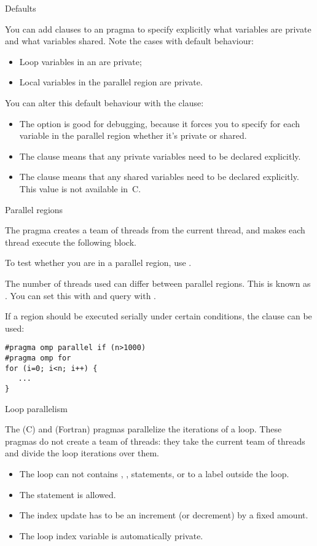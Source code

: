  {Defaults}

You can add clauses to an  pragma
to specify explicitly what variables are private and what variables shared.
Note the cases with default behaviour:
\begin{itemize}
\item Loop variables in an  are private;
\item Local variables in the parallel region are private.
\end{itemize}
You can alter this default behaviour with the  clause:
\begin{itemize}
\item The  option is good for debugging, 
  because it forces you to specify for each variable in the parallel region
  whether it's private or shared.
\item The  clause means that any private variables
  need to be declared explicitly.
\item The  clause means that any shared variables
  need to be declared explicitly. This value is not available in~C.
\end{itemize}

 {Parallel regions}

The  pragma creates a team of threads from the current thread,
and makes each thread execute the following block.

To test whether you are in a parallel region, use
.

The number of threads used can differ between parallel regions. This is known
as . You can set this with
 and query with
.

If a region should be executed serially under certain conditions,
the  clause can be used:
\begin{verbatim}
#pragma omp parallel if (n>1000)
#pragma omp for
for (i=0; i<n; i++) {
   ...
}
\end{verbatim}

 {Loop parallelism}

The  (C) and  (Fortran) pragmas
parallelize the iterations of a loop. 
These pragmas do not create a team of threads: they
take the current team of threads and divide the loop iterations over them.
\begin{itemize}
\item The loop can not contains , ,  statements, or
   to a label outside the loop.
\item The  statement is allowed.
\item The index update has to be an increment (or decrement) by a fixed amount.
\item The loop index variable is automatically private.
\end{itemize}

